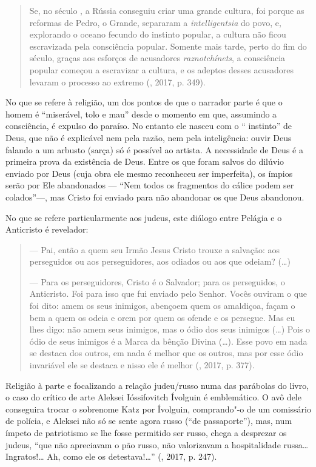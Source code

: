 \begin{quotation}
Se, no século , a Rússia conseguiu criar uma grande
cultura, foi porque as reformas de Pedro, o Grande, separaram a
\emph{intelligentsia} do povo, e, explorando o oceano fecundo do instinto
popular, a cultura não ficou escravizada pela consciência popular. Somente
mais tarde, perto do fim do século, graças aos esforços de
acusadores \emph{raznotchínets}, a consciência popular começou a escravizar a
cultura, e os adeptos desses acusadores levaram o processo ao extremo
(, 2017, p. 349).
\end{quotation}

No que se refere à religião, um dos pontos de que o narrador parte é que
o homem é ``miserável, tolo e mau'' desde o momento em que, assumindo a
consciência, é expulso do paraíso. No entanto ele nasceu com o ``
instinto'' de Deus, que não é explicável nem pela razão, nem pela
inteligência: ouvir Deus falando a um arbusto (sarça) só é possível ao artista.
A necessidade de Deus é a primeira prova da existência de Deus. Entre os
que foram salvos do dilúvio enviado por Deus (cuja obra ele mesmo
reconheceu ser imperfeita), os ímpios serão por Ele abandonados ---
``Nem todos os fragmentos do cálice podem ser colados''---, mas Cristo
foi enviado para não abandonar os que Deus abandonou.

No que se refere particularmente aos judeus, este diálogo entre Pelágia
e o Anticristo é revelador:

\begin{quotation}
--- Pai, então a quem seu Irmão Jesus Cristo trouxe a salvação: aos perseguidos ou aos perseguidores, aos odiados ou aos que odeiam? (\ldots{})

--- Para os perseguidores, Cristo é o Salvador; para os perseguidos, o
Anticristo. Foi para isso que fui enviado pelo Senhor. Vocês
ouviram o que foi dito: amem os seus inimigos, abençoem quem os
amaldiçoa, façam o bem a quem os odeia e orem por quem os ofende
e os persegue. Mas eu lhes digo: não amem seus inimigos, mas o ódio dos
seus inimigos (\ldots{}) Pois o ódio de seus inimigos é a Marca da bênção Divina
(\ldots{}). Esse povo em nada se destaca dos outros, em nada é
melhor que os outros, mas por esse ódio invariável ele se destaca e nisso ele é melhor
(, 2017, p. 377).
\end{quotation}

Religião à parte e focalizando a relação judeu/russo numa das
parábolas do livro, o caso do crítico de arte Aleksei Ióssifovitch
Ívolguin é emblemático. O avô dele conseguira trocar o sobrenome Katz por
Ívolguin, comprando"-o de um comissário de polícia, e Aleksei não só se sente agora
russo (``de passaporte''), mas, num ímpeto de patriotismo se lhe
fosse permitido ser russo, chega a desprezar os judeus,
``que não apreciavam o pão russo, não valorizavam a hospitalidade russa\ldots{} Ingratos!\ldots{}
Ah, como ele os detestava!\ldots{}'' (, 2017, p. 247).

